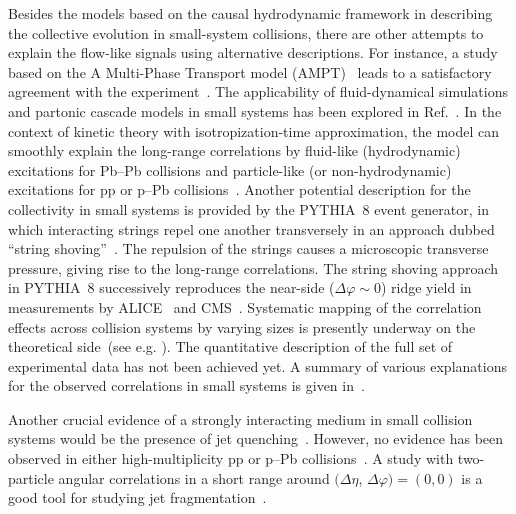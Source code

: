 Besides the models based on the causal hydrodynamic framework in describing the collective evolution in small-system collisions, there are other attempts to explain the flow-like signals using alternative descriptions. For instance, a study based on the A Multi-Phase Transport model (AMPT)~\cite{Lin:2004en} leads to a satisfactory agreement with the experiment~\cite{OrjuelaKoop:2015jss}. The applicability of fluid-dynamical simulations and partonic cascade models in small systems has been explored in Ref.~\cite{Gallmeister:2018mcn}. In the context of kinetic theory with isotropization-time approximation, the model can smoothly explain the long-range correlations by fluid-like (hydrodynamic) excitations for Pb--Pb collisions and particle-like (or non-hydrodynamic) excitations for pp or p--Pb collisions~\cite{Kurkela:2019kip,Kurkela:2020wwb,Ambrus:2021fej}. Another potential description for the collectivity in small systems is provided by the PYTHIA~8 event generator, in which interacting strings repel one another transversely in an approach dubbed ``string shoving''~\cite{Bierlich:2017vhg,Bierlich:2019ixq}. The repulsion of the strings causes a microscopic transverse pressure, giving rise to the long-range correlations. The string shoving approach in PYTHIA~8 successively reproduces the near-side ($\Delta\varphi\sim0$) ridge yield in measurements by ALICE~\cite{ALICE:2021nir} and CMS~\cite{Khachatryan:2016txc}. Systematic mapping of the correlation effects across collision systems by varying sizes is presently underway on the theoretical side~(see e.g. \cite{Schenke:2020mbo}). The quantitative description of the full set of experimental data has not been achieved yet. A summary of various explanations for the observed correlations in small systems is given in~\cite{Strickland:2018exs,Loizides:2016tew,Nagle:2018nvi}. 

Another crucial evidence of a strongly interacting medium in small collision systems would be the presence of jet quenching~\cite{Gyulassy:1990ye,Wang:1991xy}. However, no evidence has been observed in either high-multiplicity pp or p--Pb collisions~\cite{Adam:2014qja,Khachatryan:2016odn,Adam:2016jfp,Adam:2016dau,Acharya:2017okq}. A study with two-particle angular correlations in a short range around $(\Delta\eta$, $\Delta\varphi)=(0,0)$ is a good tool for studying jet fragmentation~\cite{Adam:2016tsv}.

